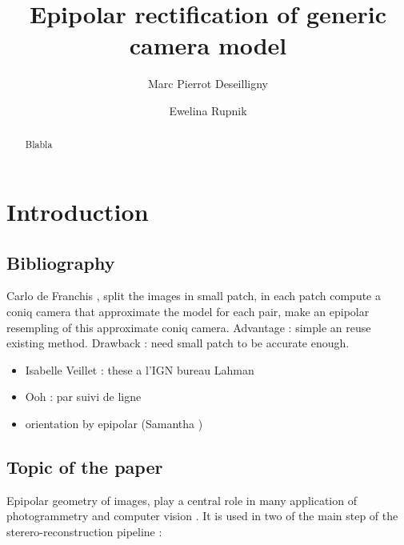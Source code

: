 \documentclass[a4paper]{article}
\begin{document}

\title{Epipolar rectification of generic camera  model}

\author[1]{Marc Pierrot Deseilligny}
\author[1]{Ewelina Rupnik}


\maketitle 

\begin{abstract}
   Blabla
\end{abstract}



\section{Introduction}


\subsection{Bibliography}

Carlo de Franchis , split the images in small patch, in each patch compute a coniq
camera that approximate the model for each pair, make an epipolar resempling of
this approximate coniq camera.  Advantage : simple an reuse existing method.
Drawback : need small patch to be accurate enough.


\begin{itemize}
   \item Isabelle Veillet :   these a l'IGN bureau Lahman
   \item Ooh   : par suivi de ligne  
   \item orientation by epipolar (Samantha )
\end{itemize}

\subsection{Topic of the paper}

Epipolar geometry of images, play a central role in many application of photogrammetry and computer vision .
It is  used in two of the main step of the sterero-reconstruction pipeline :
\end{document}
